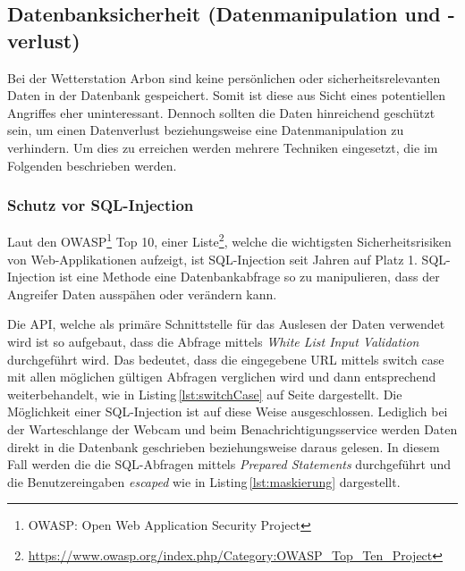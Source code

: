 




\subsection{Datenbanksicherheit (Datenmanipulation und -verlust)}
Bei der Wetterstation Arbon sind keine persönlichen oder sicherheitsrelevanten Daten in der Datenbank gespeichert. Somit ist diese aus Sicht eines potentiellen Angriffes eher uninteressant. Dennoch sollten die Daten hinreichend geschützt sein, um einen Datenverlust beziehungsweise eine Datenmanipulation zu verhindern. Um dies zu erreichen werden mehrere Techniken eingesetzt, die im Folgenden beschrieben werden.

\subsubsection{Schutz vor SQL-Injection}
Laut den OWASP\footnote{OWASP: Open Web Application Security Project} Top 10, einer Liste\footnote{ \url{https://www.owasp.org/index.php/Category:OWASP_Top_Ten_Project}}, welche die wichtigsten Sicherheitsrisiken von Web-Applikationen aufzeigt, ist SQL-Injection seit Jahren auf Platz 1. SQL-Injection ist eine Methode eine Datenbankabfrage so zu manipulieren, dass der Angreifer Daten ausspähen oder verändern kann.

Die API, welche als primäre Schnittstelle für das Auslesen der Daten verwendet wird ist so aufgebaut, dass die Abfrage mittels \emph{White List Input Validation} durchgeführt wird. Das bedeutet, dass die eingegebene URL mittels switch case mit allen möglichen gültigen Abfragen verglichen wird und dann entsprechend weiterbehandelt, wie in Listing\,\ref{lst:switchCase} auf Seite \pageref{lst:switchCase} dargestellt. Die Möglichkeit einer SQL-Injection ist auf diese Weise ausgeschlossen. Lediglich bei der Warteschlange der Webcam und beim Benachrichtigungsservice werden Daten direkt in die Datenbank geschrieben beziehungsweise daraus gelesen. In diesem Fall werden die
die SQL-Abfragen mittels \emph{Prepared Statements} durchgeführt und die Benutzereingaben \emph{escaped} wie in Listing\,\ref{lst:maskierung} dargestellt.

